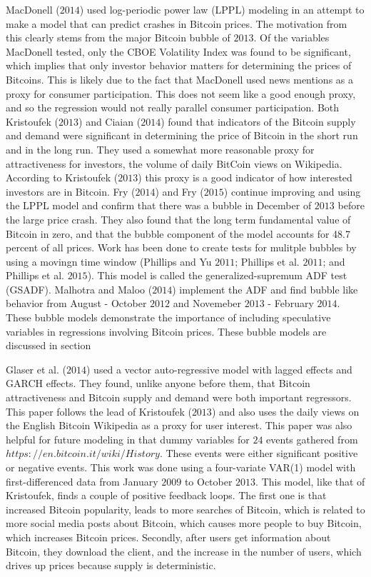 \documentclass{article}[10 pt]
\newcommand{\vs}{\vspace{0.1in}}
\begin{document}
MacDonell ($2014$) used log-periodic power law (LPPL) modeling in an attempt to
make a model that can predict crashes in Bitcoin prices. The motivation from
this clearly stems from the major Bitcoin bubble of $2013$. Of the variables
MacDonell tested, only the CBOE Volatility Index was found to be
significant, which implies that only investor behavior matters for
determining the prices of Bitcoins. This is likely due to the fact that
MacDonell used news mentions as a proxy for consumer participation. This
does not seem like a good enough proxy, and so the regression would not
really parallel consumer participation. Both Kristoufek ($2013$) and Ciaian
($2014$) found that indicators of the Bitcoin supply and demand were
significant in determining the price of Bitcoin in the short run and in the
long run. They used a somewhat more reasonable proxy for attractiveness for
investors, the volume of daily BitCoin views on Wikipedia. According to
Kristoufek ($2013$) this proxy is a good indicator of how interested
investors are in Bitcoin. Fry ($2014$) and Fry ($2015$) continue improving
and using the LPPL model and confirm that there was a bubble in December of
$2013$ before the large price crash. They also found that the long term
fundamental value of Bitcoin in zero, and that the bubble component of the
model accounts for 48.7 percent of all prices. Work has been done to
create tests for mulitple bubbles by using a movingn time window (Phillips
and Yu $2011$; Phillips et al. $2011$; and Phillips et al. $2015$). This
model is called the generalized-supremum ADF test (GSADF). Malhotra and
Maloo ($2014$) implement the ADF and find bubble like behavior from August -
October $2012$ and Novemeber $2013$ - February $2014$. These bubble models
demonstrate the importance of including speculative variables in regressions
involving Bitcoin prices. These bubble models are discussed in section 

\vs

Glaser et al. ($2014$) used a vector auto-regressive model with lagged
effects and GARCH effects. They found, unlike anyone before them, that Bitcoin
attractiveness and Bitcoin supply and demand were both important regressors.
This paper follows the lead of Kristoufek ($2013$) and also uses the daily views on
the English Bitcoin Wikipedia as a proxy for user interest.
This paper was also helpful for future modeling in that dummy variables for
$24$ events gathered from $https://en.bitcoin.it/wiki/History$. These events
were either significant positive or negative events. This work was done
using a four-variate VAR(1) model with first-differenced data from January
$2009$ to October $2013$. This model, like that of Kristoufek, finds a couple of positive
feedback loops. The first one is that increased Bitcoin popularity, leads to
more searches of Bitcoin, which is related to more social media posts about
Bitcoin, which causes more people to buy Bitcoin, which increases Bitcoin
prices. Secondly, after users get information about Bitcoin, they download
the client, and the increase in the number of users, which drives up prices because
supply is deterministic.
\end{document}

